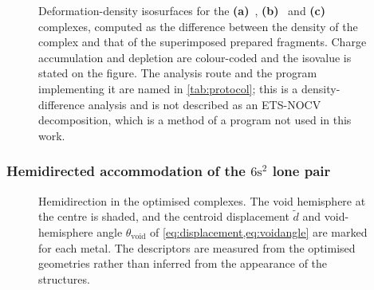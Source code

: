 \begin{figure}[htbp]
  \centering
  \caption[Deformation-density isosurfaces]{Deformation-density isosurfaces for the \textbf{(a)}~\PbII{}, \textbf{(b)}~\CuII{} and \textbf{(c)}~\ZnII{} complexes, computed as the difference between the density of the complex and that of the superimposed prepared fragments. Charge accumulation and depletion are colour-coded and the isovalue is stated on the figure. The analysis route and the program implementing it are named in \cref{tab:protocol}; this is a density-difference analysis and is not described as an ETS-NOCV decomposition, which is a method of a program not used in this work.}
  \label{fig:density-difference}
\end{figure}

\subsubsection{Hemidirected accommodation of the $6\mathrm{s}^2$ lone pair}
\label{sec:results-hemidirection}

\begin{figure}[htbp]
  \centering
  \caption[Hemidirection descriptors in the optimised complexes]{Hemidirection in the optimised complexes. The void hemisphere at the \PbII{} centre is shaded, and the centroid displacement $\tilde{d}$ and void-hemisphere angle $\theta_{\mathrm{void}}$ of \cref{eq:displacement,eq:voidangle} are marked for each metal. The descriptors are measured from the optimised geometries rather than inferred from the appearance of the structures.}
  \label{fig:hemidirection}
\end{figure}

